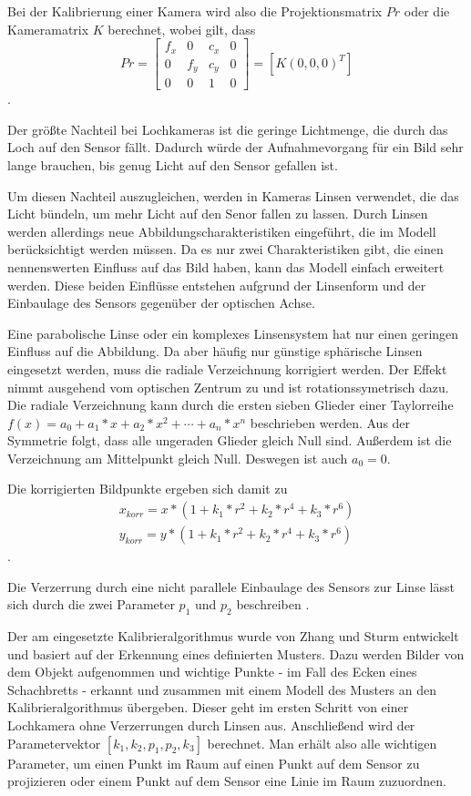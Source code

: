 Bei der Kalibrierung einer Kamera wird also die Projektionsmatrix $Pr$ oder die
Kameramatrix $K$ berechnet, wobei gilt, dass \begin{equation} Pr=
  \begin{bmatrix} f_x&0&c_x&0\\ 0&f_y&c_y&0\\ 0&0&1&0 \end{bmatrix} = \left[K
  \left(0,0,0\right)^T\right] \end{equation}.

Der größte Nachteil bei Lochkameras ist die geringe Lichtmenge, die durch das
Loch auf den Sensor fällt. Dadurch würde der Aufnahmevorgang für ein Bild sehr
lange brauchen, bis genug Licht auf den Sensor gefallen ist.

Um diesen Nachteil auszugleichen, werden in Kameras Linsen verwendet, die das
Licht bündeln, um mehr Licht auf den Senor fallen zu lassen. Durch Linsen werden
allerdings neue Abbildungscharakteristiken eingeführt, die im Modell
berücksichtigt werden müssen. Da es nur zwei Charakteristiken gibt, die einen
nennenswerten Einfluss auf das Bild haben, kann das Modell einfach erweitert
werden. Diese beiden Einflüsse entstehen aufgrund der Linsenform und der
Einbaulage des Sensors gegenüber der optischen Achse. 

Eine parabolische Linse oder ein komplexes Linsensystem hat nur einen geringen
Einfluss auf die Abbildung. Da aber häufig nur günstige sphärische Linsen
eingesetzt werden, muss die radiale Verzeichnung korrigiert werden. Der Effekt
nimmt ausgehend vom optischen Zentrum zu und ist rotationssymetrisch dazu. Die
radiale Verzeichnung kann durch die ersten sieben Glieder einer Taylorreihe
$f(x)=a_0+a_1*x+a_2*x^2+\cdots+a_n*x^n$ beschrieben werden. Aus der Symmetrie
folgt, dass alle ungeraden Glieder gleich Null sind. Außerdem ist die
Verzeichnung am Mittelpunkt gleich Null. Deswegen ist auch $a_0=0$.

Die korrigierten Bildpunkte ergeben sich damit zu 
  \begin{align} x_{korr}=x*(1+k_1*r^2+k_2*r^4+k_3*r^6)\\
    y_{korr}=y*(1+k_1*r^2+k_2*r^4+k_3*r^6) \end{align}.

Die Verzerrung durch eine nicht parallele Einbaulage des Sensors zur Linse lässt
sich durch die zwei
Parameter $p_1$ und $p_2$ beschreiben \cite{Bradski2008}.

Der am \cob eingesetzte Kalibrieralgorithmus wurde von Zhang und Sturm
entwickelt und basiert auf der Erkennung eines definierten Musters. Dazu werden
Bilder von dem Objekt aufgenommen und wichtige Punkte - im Fall des \cob Ecken
eines Schachbretts - erkannt und zusammen mit einem Modell des Musters an den
Kalibrieralgorithmus übergeben. Dieser geht im ersten Schritt von einer
Lochkamera ohne Verzerrungen durch Linsen aus. Anschließend wird der
Parametervektor $\left[k_1,k_2,p_1,p_2,k_3\right]$ berechnet.\cite{zhang2000flexible}
Man erhält also alle wichtigen Parameter, um einen Punkt im Raum auf einen Punkt auf dem Sensor
zu projizieren oder einem Punkt auf dem Sensor eine Linie im Raum zuzuordnen.

